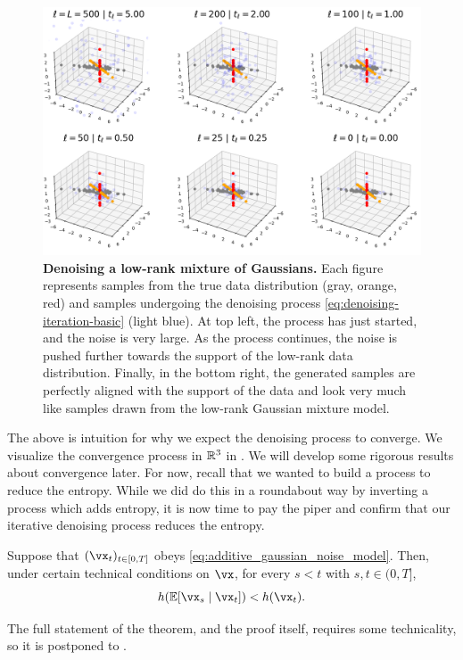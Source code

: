 \documentclass[../../book-main.tex]{subfiles}
\begin{document}
\begin{figure}[t]
	\centering
	\includegraphics[width=\textwidth]{chapters/chapter3/figs/ve_gmm_denoising.png}
	\caption{\small\textbf{Denoising a low-rank mixture of Gaussians.} Each figure represents samples from the true data distribution (gray, orange, red) and samples undergoing the denoising process \eqref{eq:denoising-iteration-basic} (light blue). At top left, the process has just started, and the noise is very large. As the process continues, the noise is pushed further towards the support of the low-rank data distribution. Finally, in the bottom right, the generated samples are perfectly aligned with the support of the data and look very much like samples drawn from the low-rank Gaussian mixture model.}
	\label{fig:ve_gmm_denoising}
\end{figure}

The above is intuition for why we expect the denoising process to converge. We visualize the convergence process in \(\mathbb{R}^{3}\) in . We will develop some rigorous results about convergence later. For now, recall that we wanted to build a process to reduce the entropy. While we did do this in a roundabout way by inverting a process which adds entropy, it is now time to pay the piper and confirm that our iterative denoising process reduces the entropy.

\begin{theorem}
	Suppose that \((\vx_{t})_{t \in [0, T]}\) obeys \eqref{eq:additive_gaussian_noise_model}. Then, under certain technical conditions on \(\vx\), for every \(s < t\) with \(s, t \in (0, T]\),
	\begin{equation}
		h(\Ex[\vx_{s} \mid \vx_{t}]) < h(\vx_{t}).
	\end{equation}
\end{theorem}
The full statement of the theorem, and the proof itself, requires some technicality, so it is postponed to .
\end{document}
